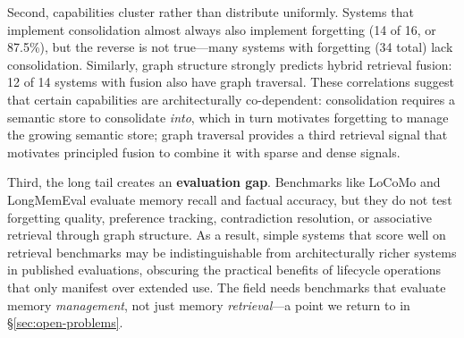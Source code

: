 Second, capabilities cluster rather than distribute uniformly. Systems that
implement consolidation almost always also implement forgetting (14 of 16, or
87.5\%), but the reverse is not true---many systems with forgetting (34 total)
lack consolidation. Similarly, graph structure strongly predicts hybrid
retrieval fusion: 12 of 14 systems with fusion also have graph traversal.
These correlations suggest that certain capabilities are architecturally
co-dependent: consolidation requires a semantic store to consolidate
\emph{into}, which in turn motivates forgetting to manage the growing semantic
store; graph traversal provides a third retrieval signal that motivates
principled fusion to combine it with sparse and dense signals.

Third, the long tail creates an \textbf{evaluation gap}. Benchmarks like
LoCoMo and LongMemEval evaluate memory recall and factual accuracy, but they
do not test forgetting quality, preference tracking, contradiction resolution,
or associative retrieval through graph structure. As a result, simple systems
that score well on retrieval benchmarks may be indistinguishable from
architecturally richer systems in published evaluations, obscuring the
practical benefits of lifecycle operations that only manifest over extended
use. The field needs benchmarks that evaluate memory \emph{management}, not
just memory \emph{retrieval}---a point we return to in
\S\ref{sec:open-problems}.


